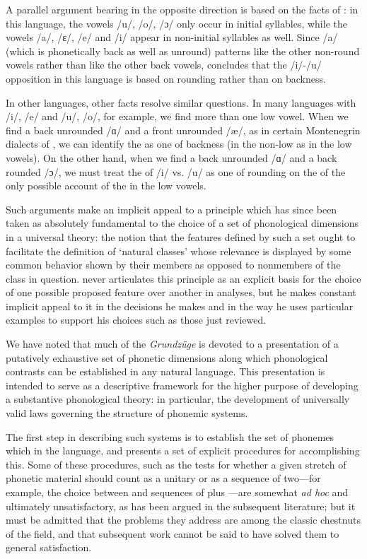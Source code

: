 A parallel argument bearing in the opposite direction is based on the
facts of : in this language, the vowels /u/, /o/, /ɔ/
only occur in initial syllables, while the vowels /a/, /ɛ/, /e/ and /i/
appear in non-initial syllables as well. Since /a/ (which is
phonetically back as well as unround) patterns like the other
non-round vowels rather than like the other back vowels, {\Trubetzkoy}
concludes that the /i/-/u/ opposition in this language is based on
rounding rather than on backness.

In other languages, other facts resolve similar questions. In many
languages with /i/, /e/ and /u/, /o/, for example, we find more than
one low vowel. When we find a back unrounded /ɑ/ and a front unrounded
/æ/, as in certain Montenegrin dialects of , we can
identify the  as one of backness (in the non-low as in the low
vowels). On the other hand, when we find a back unrounded /ɑ/ and a
back rounded /ɔ/, we must treat the  of /i/ vs. /u/ as one of
rounding on the  of the only possible account of the 
in the low vowels.

Such arguments make an implicit appeal to a principle which has since
been taken as absolutely fundamental to the choice of a set of
phonological dimensions in a universal theory: the notion that the
features defined by such a set ought to facilitate the definition of
`natural classes' whose relevance is displayed by some common behavior
shown by their members as opposed to nonmembers of the class in
question. {\Trubetzkoy} never articulates this principle as an explicit
basis for the choice of one possible proposed feature over another in
analyses, but he makes constant implicit appeal to it in the decisions
he makes and in the way he uses particular examples to support his
choices such as those just reviewed.

We have noted that much of the \textsl{Grundzüge} is devoted to a
presentation of a putatively exhaustive set of phonetic dimensions
along which phonological contrasts can be established in any natural
language. This presentation is intended to serve as a descriptive
framework for the higher purpose of developing a substantive
phonological theory: in particular, the development of universally
valid laws governing the structure of phonemic systems.

The first step in describing such systems is to establish the set of
phonemes which  in the language, and {\Trubetzkoy} presents a set
of explicit procedures for accomplishing this. Some of these
procedures, such as the tests for whether a given stretch of phonetic
material should count as a unitary  or as a sequence of two—for
example, the choice between  and sequences of  plus
—are somewhat \emph{ad hoc} and ultimately unsatisfactory,
as has been argued in the subsequent literature; but it must be
admitted that the problems they address are among the classic
chestnuts of the field, and that subsequent work cannot be said to
have solved them to general satisfaction.

